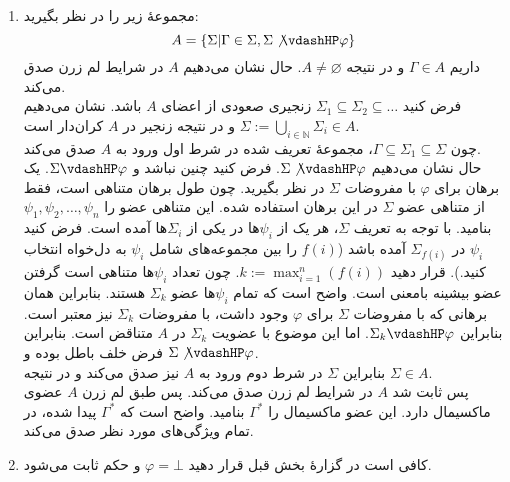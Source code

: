 \begin{ans}
    \begin{enumerate}[label=(\alph*)]
        \item
        مجموعهٔ زیر را در نظر بگیرید:
        $$A = \{\Sigma | \Gamma \in \Sigma, \Sigma \not\vdashHP \varphi\}$$
        داریم $\Gamma \in A$ و در نتیجه $A \neq \varnothing$. حال نشان می‌دهیم $A$ در شرایط لم زرن صدق می‌کند.\\
        فرض کنید $\Sigma_1 \subseteq \Sigma_2 \subseteq \dots$ زنجیری صعودی از اعضای $A$ باشد. نشان می‌دهیم $\Sigma := \bigcup_{i\in\mathbb{N}} \Sigma_i \in A$ و در نتیجه زنجیر در $A$ کران‌دار است.\\
        چون $\Gamma \subseteq \Sigma_1 \subseteq \Sigma$، مجموعهٔ تعریف شده در شرط اول ورود به $A$ صدق می‌کند.\\
        حال نشان می‌دهیم $\Sigma \not\vdashHP \varphi$. فرض کنید چنین نباشد و $\Sigma \vdashHP \varphi$. یک برهان برای $\varphi$ با مفروضات $\Sigma$ در نظر بگیرید. چون طول برهان متناهی است، فقط از متناهی عضو $\Sigma$ در این برهان استفاده شده. این متناهی عضو را $\psi_1, \psi_2, \dots, \psi_n$ بنامید. با توجه به تعریف $\Sigma$، هر یک از $\psi_i$ها در یکی از $\Sigma_i$ها آمده است. فرض کنید $\psi_i$ در $\Sigma_{f(i)}$ آمده باشد ($f(i)$ را بین مجموعه‌های شامل $\psi_i$ به دل‌خواه انتخاب کنید.). قرار دهید $k := \max_{i=1}^n(f(i))$. چون تعداد $\psi_i$ها متناهی است گرفتن عضو بیشینه بامعنی است. واضح است که تمام $\psi_i$ها عضو $\Sigma_k$ هستند. بنابراین همان برهانی که با مفروضات $\Sigma$ برای $\varphi$ وجود داشت، با مفروضات $\Sigma_k$ نیز معتبر است. بنابراین $\Sigma_k \vdashHP \varphi$. اما این موضوع با عضویت $\Sigma_k$ در $A$ متناقض است. بنابراین فرض خلف باطل بوده و $\Sigma \not\vdashHP \varphi$.\\
        بنابراین $\Sigma$ در شرط دوم ورود به $A$ نیز صدق می‌کند و در نتیجه $\Sigma \in A$.\\
        پس ثابت شد $A$ در شرایط لم زرن صدق می‌کند. پس طبق لم زرن $A$ عضوی ماکسیمال دارد. این عضو ماکسیمال را $\Gamma^*$ بنامید. واضح است که $\Gamma^*$ پیدا شده، در تمام ویژگی‌های مورد نظر صدق می‌کند.

        \item
        کافی است در گزارهٔ بخش قبل قرار دهید $\varphi = \bot$ و حکم ثابت می‌شود.


\end{enumerate}
\end{ans}

